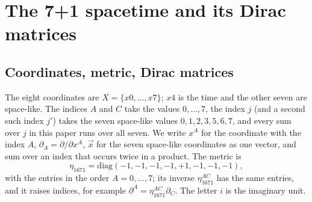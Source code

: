 \section{The 7+1 spacetime and its Dirac matrices}
\label{sec:spacetime}

\subsection{Coordinates, metric, Dirac matrices}

The eight coordinates are $X=\{x0,\dots,x7\}$; $x4$ is the time and the other seven are
space-like. The indices $A$ and $C$ take the values $0,\dots,7$, the index $j$ (and a second
such index $j'$) takes the seven space-like values $0,1,2,3,5,6,7$, and every sum over $j$ in
this paper runs over all seven. We write $x^A$ for the coordinate with the index $A$,
$\partial_A=\partial/\partial x^A$, $\vec x$ for the seven space-like coordinates as one vector,
and sum over an index that occurs twice in a product. The metric is
\begin{equation}
\eta_{1671}=\mathrm{diag}(-1,-1,-1,-1,+1,-1,-1,-1),
\label{eq:metric}
\end{equation}
with the entries in the order $A=0,\dots,7$; its inverse $\eta^{AC}_{1671}$ has the same entries,
and it raises indices, for example $\partial^A=\eta^{AC}_{1671}\partial_C$. The letter $i$ is the
imaginary unit.

